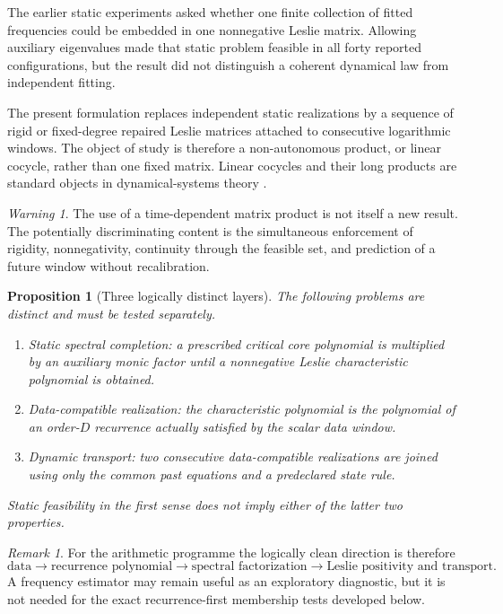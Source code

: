 \documentclass[11pt]{amsart}
\numberwithin{equation}{section}
\theoremstyle{plain}
\newtheorem{proposition}[theorem]{Proposition}
\theoremstyle{definition}
\theoremstyle{remark}
\newtheorem{remark}[theorem]{Remark}
\newtheorem{warning}[theorem]{Warning}
\begin{document}
The earlier static experiments asked whether one finite collection of fitted frequencies could be embedded in one nonnegative Leslie matrix.  Allowing auxiliary eigenvalues made that static problem feasible in all forty reported configurations, but the result did not distinguish a coherent dynamical law from independent fitting.

The present formulation replaces independent static realizations by a sequence of rigid or fixed-degree repaired Leslie matrices attached to consecutive logarithmic windows.  The object of study is therefore a non-autonomous product, or linear cocycle, rather than one fixed matrix.  Linear cocycles and their long products are standard objects in dynamical-systems theory \cite{DuarteKlein2016}.

\begin{warning}
\label{warn:no_automatic_novelty}
The use of a time-dependent matrix product is not itself a new result.  The potentially discriminating content is the simultaneous enforcement of rigidity, nonnegativity, continuity through the feasible set, and prediction of a future window without recalibration.
\end{warning}

\begin{proposition}[Three logically distinct layers]
\label{prop:three_layers}
The following problems are distinct and must be tested separately.
\begin{enumerate}
\item \emph{Static spectral completion:} a prescribed critical core polynomial is multiplied by an auxiliary monic factor until a nonnegative Leslie characteristic polynomial is obtained.
\item \emph{Data-compatible realization:} the characteristic polynomial is the polynomial of an order-$D$ recurrence actually satisfied by the scalar data window.
\item \emph{Dynamic transport:} two consecutive data-compatible realizations are joined using only the common past equations and a predeclared state rule.
\end{enumerate}
Static feasibility in the first sense does not imply either of the latter two properties.
\end{proposition}

\begin{remark}
\label{rem:data_first_principle}
For the arithmetic programme the logically clean direction is therefore
\[
\text{data}\longrightarrow\text{recurrence polynomial}\longrightarrow\text{spectral factorization}\longrightarrow\text{Leslie positivity and transport}.
\]
A frequency estimator may remain useful as an exploratory diagnostic, but it is not needed for the exact recurrence-first membership tests developed below.
\end{remark}
\end{document}
